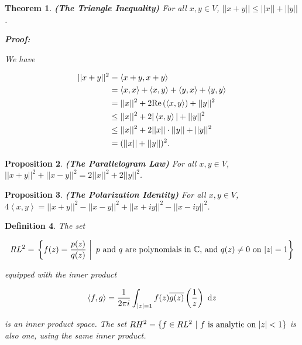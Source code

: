 \documentclass{article}
\theoremstyle{colontheorem}
\newtheorem{theorem}{Theorem}[section]
\newtheorem{proposition}[theorem]{Proposition}
\newtheorem{definition}[theorem]{Definition}
\newenvironment{Theorem}
{
	\begin{mdframed}[backgroundcolor=TheoremOrange!10]
	\begin{theorem}
}
{
	\end{theorem}
	\end{mdframed}
	
	\vspace{.15in}
}
\newenvironment{Proposition}
{
	\begin{mdframed}[backgroundcolor=TheoremOrange!10]
	\begin{proposition}
}
{
	\end{proposition}
	\end{mdframed}
	
	\vspace{.15in}
}
\newenvironment{Def}
{
	\begin{mdframed}[backgroundcolor=DefGreen!10]
	\begin{definition}
}
{
	\end{definition}
	\end{mdframed}
	
	\vspace{.15in}
}
\newenvironment{Proof}
{
	\begin{mdframed}[backgroundcolor=ProofPurple!10]
	\textbf{Proof:}%
}
{
	\end{mdframed}
	
	\vspace{.085in}
}
\begin{document}
\begin{Theorem}
	
	\textbf{(The Triangle Inequality)} For all $x, y \in V$, $||x + y|| \leq ||x|| + ||y||$.
	
	\begin{Proof}
		We have
		
		\begin{align*}
			||x + y||^2 &= \left< x + y, x + y \right>\\
			&= \left< x, x \right> + \left< x, y \right> + \left< y, x \right> + \left< y, y \right>\\
			&= ||x||^2 + 2\textnormal{Re} \left( \left< x, y \right> \right) + ||y||^2\\
			&\leq ||x||^2 + 2| \left< x, y \right> | + ||y||^2\\
			&\leq ||x||^2 + 2||x||\cdot||y|| + ||y||^2\\
			&= (||x|| + ||y||)^2.
		\end{align*}
		
	\end{Proof}
	
\end{Theorem}



\begin{Proposition}
	
	\textbf{(The Parallelogram Law)} For all $x, y \in V$, $||x + y||^2 + ||x - y||^2 = 2||x||^2 + 2||y||^2$.
	
\end{Proposition}



\begin{Proposition}
	
	\textbf{(The Polarization Identity)} For all $x, y \in V$, $4 \left< x, y \right> = ||x + y||^2 - ||x - y||^2 + ||x + iy||^2 - ||x - iy||^2$.
	
\end{Proposition}



\begin{Def}
	
	The set
	
	$$
		RL^2 = \left. \left\{ f(z) = \frac{p(z)}{q(z)}\ \right|\ p \textnormal{ and } q \textnormal{ are polynomials in } \mathbb{C} \textnormal{, and } q(z) \neq 0 \textnormal{ on } |z| = 1 \right\}
	$$
	
	equipped with the inner product
	
	$$
		\left< f, g \right> = \frac{1}{2 \pi i} \int_{|z| = 1} f(z) \overline{g(z)} \left( \frac{1}{z} \right)\ \textnormal{d}z
	$$
	
	is an inner product space. The set $RH^2 = \{f \in RL^2\ |\ f \textnormal{ is analytic on } |z| < 1 \}$ is also one, using the same inner product.
	
\end{Def}
\end{document}
